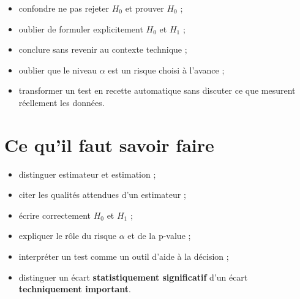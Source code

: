 \begin{itemize}
    \item confondre \og ne pas rejeter $H_0$ \fg{} et \og prouver $H_0$ \fg ;
    \item oublier de formuler explicitement $H_0$ et $H_1$ ;
    \item conclure sans revenir au contexte technique ;
    \item oublier que le niveau $\alpha$ est un risque choisi à l'avance ;
    \item transformer un test en recette automatique sans discuter ce que mesurent réellement les données.
\end{itemize}

\section{Ce qu'il faut savoir faire}

\begin{itemize}
    \item distinguer estimateur et estimation ;
    \item citer les qualités attendues d'un estimateur ;
    \item écrire correctement $H_0$ et $H_1$ ;
    \item expliquer le rôle du risque $\alpha$ et de la p-value ;
    \item interpréter un test comme un outil d'aide à la décision ;
    \item distinguer un écart \textbf{statistiquement significatif} d'un écart \textbf{techniquement important}.
\end{itemize}
